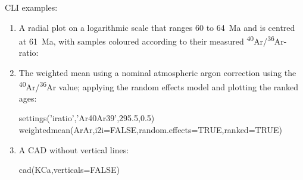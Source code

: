 \begin{refsection}
\noindent CLI examples:

\begin{enumerate}

\item A radial plot on a logarithmic scale that ranges 60 to 64~Ma and
  is centred at 61~Ma, with samples coloured according to their
  measured \textsuperscript{40}Ar/\textsuperscript{36}Ar-ratio:


\item The weighted mean using a nominal atmospheric argon correction
  using the \citep{nier1950}
  \textsuperscript{40}Ar/\textsuperscript{36}Ar value; applying the
  random effects model and plotting the ranked ages:
  
\begin{script}
settings('iratio','Ar40Ar39',295.5,0.5)
weightedmean(ArAr,i2i=FALSE,random.effects=TRUE,ranked=TRUE)
\end{script}

\item A CAD without vertical lines:

\begin{console}
cad(KCa,verticals=FALSE)
\end{console}
  
\end{enumerate}

\printbibliography[heading=subbibliography]

\end{refsection}
